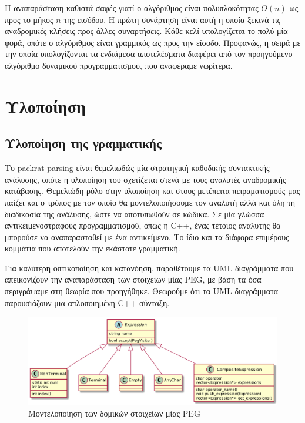 \documentclass[diploma]{softlab-thesis}
\begin{document}
Η αναπαράσταση καθιστά σαφές γιατί ο αλγόριθμος είναι πολυπλοκότητας $O(n)$ ως προς το μήκος $n$ της εισόδου.
Η πρώτη συνάρτηση είναι αυτή η οποία ξεκινά τις αναδρομικές κλήσεις προς άλλες συναρτήσεις.
Κάθε κελί υπολογίζεται το πολύ μία φορά, οπότε ο αλγόριθμος είναι γραμμικός ως προς την είσοδο. 
Προφανώς, η σειρά με την οποία υπολογίζονται τα ενδιάμεσα αποτελέσματα διαφέρει από τον προηγούμενο αλγόριθμο δυναμικού προγραμματισμού, που αναφέραμε νωρίτερα.

\section{Υλοποίηση}

\subsection{Υλοποίηση της γραμματικής}
Το packrat parsing είναι θεμελιωδώς μία στρατηγική καθοδικής συντακτικής ανάλυσης, οπότε η υλοποίηση του σχετίζεται στενά με τους αναλυτές αναδρομικής κατάβασης. 
Θεμελιώδη ρόλο στην υλοποίηση και στους μετέπειτα πειραματισμούς μας παίζει και ο τρόπος με τον οποίο θα μοντελοποιήσουμε τον αναλυτή αλλά και όλη τη διαδικασία της ανάλυσης, ώστε να αποτυπωθούν σε κώδικα. 
Σε μία γλώσσα αντικειμενοστραφούς προγραμματισμού, όπως η C++, ένας τέτοιος αναλυτής θα μπορούσε να αναπαρασταθεί με ένα αντικείμενο. Το ίδιο και τα διάφορα επιμέρους κομμάτια που αποτελούν την εκάστοτε γραμματική. 

Για καλύτερη οπτικοποίηση και κατανόηση, παραθέτουμε τα UML διαγράμματα που απεικονίζουν την αναπαράσταση των στοιχείων μίας PEG, με βάση τα όσα περιγράψαμε στη θεωρία που προηγήθηκε. Θεωρούμε ότι τα UML διαγράμματα παρουσιάζουν μια απλοποιημένη C++ σύνταξη.

\begin{figure}[h]
    \centering
	\includegraphics[width=1.10\textwidth]{uml/peg_elements}
	\caption{Μοντελοποίηση των δομικών στοιχείων μίας PEG}
    \label{fig:peg_elements}
\end{figure}
\end{document}
